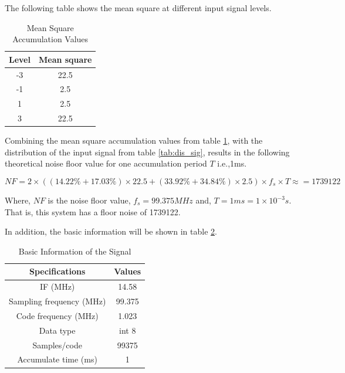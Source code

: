 The following table shows the mean square at different input signal levels.
\begin{table}[!htbp]
    \centering
    \renewcommand\arraystretch{1.5}
    \caption{Mean Square Accumulation Values}
    \label{tab:mean_square}
    \begin{tabular}{cc}
        \toprule
        Level & Mean square \\
        \midrule
        -3 & 22.5 \\
        -1 & 2.5 \\
        1 & 2.5 \\
        3 & 22.5 \\
        \bottomrule
    \end{tabular}
\end{table}

Combining the mean square accumulation values from table \ref{tab:mean_square}, with the distribution of the input signal from table \ref{tab:dis_sig}, results in the following theoretical noise floor value for one accumulation period $T$ i.e.,1ms.

\begin{equation}
    NF = 2\times ((14.22\%+17.03\%) \times 22.5 + (33.92\%+34.84\%) \times 2.5)\times f_s \times T \approx = \num{1739122}
\end{equation}

Where, $NF$ is the noise floor value, $f_s=99.375MHz$ and, $T=1ms=1\times 10^{-3}s$. That is, this system has a floor noise of \num{1739122}.

In addition, the basic information will be shown in table \ref{tab:sig_info}.

\begin{table}[!htbp]
\centering
\renewcommand\arraystretch{1.5}
\caption{Basic Information of the Signal}
\label{tab:sig_info}
\begin{tabular}{cc}
    \toprule
    Specifications & Values \\
    \midrule
    IF (MHz) & 14.58 \\
    Sampling frequency (MHz) & 99.375 \\
    Code frequency (MHz) & 1.023 \\
    Data type & int 8 \\
    Samples/code & \num{99375} \\
    Accumulate time (ms) & 1 \\
    \bottomrule
\end{tabular}
\end{table}

